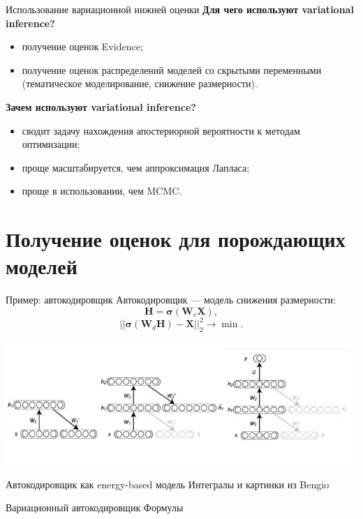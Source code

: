 \documentclass[10pt,pdf,utf8,russian,aspectratio=169]{beamer}
\begin{document}
\begin{frame}{Использование вариационной нижней оценки}
\textbf{Для чего используют variational inference?}
\begin{itemize}
\item получение оценок Evidence;
\item получение оценок распределений моделей со скрытыми переменными (тематическое моделирование, снижение размерности).
\end{itemize}

\textbf{Зачем используют variational inference?}
\begin{itemize}
\item сводит задачу нахождения апостериорной вероятности к методам оптимизации;
\item проще масштабируется, чем аппроксимация Лапласа;
\item проще в использовании, чем MCMC.
\end{itemize}
\end{frame}


\section{Получение оценок для порождающих моделей}
\begin{frame}{Пример: автокодировщик}
Автокодировщик --- модель снижения размерности:
$$
	\mathbf{H} = \boldsymbol{\sigma}(\mathbf{W}_e \mathbf{X}),
$$
$$
	||\boldsymbol{\sigma}(\mathbf{W}_d\mathbf{H}) - \mathbf{X}||_2^2 \to \min.
$$

\includegraphics[width=\textwidth]{bengio.png}
\end{frame}



\begin{frame}{Автокодировщик как energy-based модель}
Интегралы и картинки из Bengio
\end{frame}

\begin{frame}{Вариационный автокодировщик}
Формулы
\end{frame}
\end{document}
